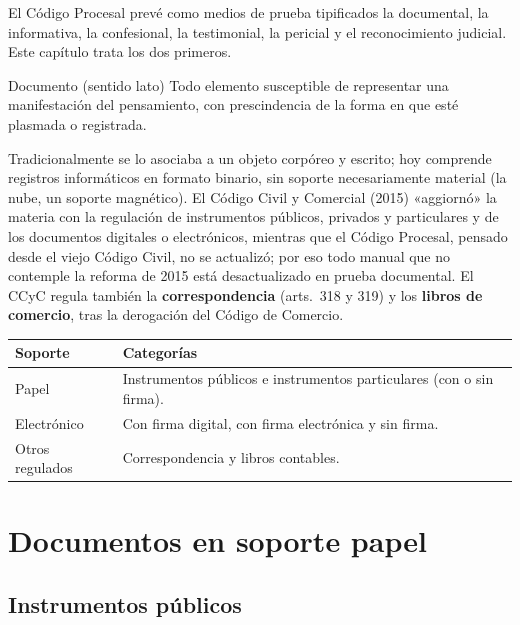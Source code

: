 \documentclass[12pt,oneside]{book}
\renewcommand{\arraystretch}{1.15}
\begin{document}
El Código Procesal prevé como medios de prueba tipificados la documental, la informativa, la confesional, la testimonial, la pericial y el reconocimiento judicial. Este capítulo trata los dos primeros.

\begin{definition}{Documento (sentido lato)}
Todo elemento susceptible de representar una manifestación del pensamiento, con prescindencia de la forma en que esté plasmada o registrada.
\end{definition}

Tradicionalmente se lo asociaba a un objeto corpóreo y escrito; hoy comprende registros informáticos en formato binario, sin soporte necesariamente material (la nube, un soporte magnético). El Código Civil y Comercial (2015) «aggiornó» la materia con la regulación de instrumentos públicos, privados y particulares y de los documentos digitales o electrónicos, mientras que el Código Procesal, pensado desde el viejo Código Civil, no se actualizó; por eso todo manual que no contemple la reforma de 2015 está desactualizado en prueba documental. El CCyC regula también la \textbf{correspondencia} (arts.~318 y 319) y los \textbf{libros de comercio}, tras la derogación del Código de Comercio.

\begin{table}[H]
\centering
\renewcommand{\arraystretch}{1.25}
\begin{tabularx}{\textwidth}{>{\RaggedRight\arraybackslash}p{}>{\RaggedRight\arraybackslash}X}
\toprule
\textbf{Soporte} & \textbf{Categorías} \\
\midrule
Papel & Instrumentos públicos e instrumentos particulares (con o sin firma). \\
Electrónico & Con firma digital, con firma electrónica y sin firma. \\
Otros regulados & Correspondencia y libros contables. \\
\bottomrule
\end{tabularx}
\end{table}

\section{Documentos en soporte papel}

\subsection{Instrumentos públicos}
\end{document}
